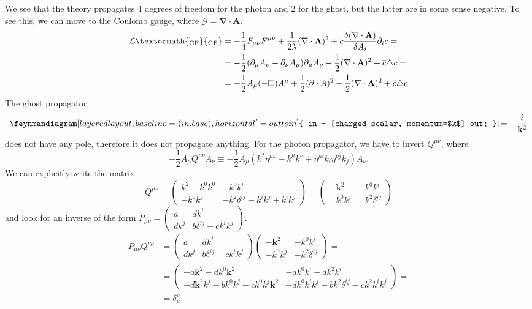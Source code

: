 \documentclass[a4paper,12pt]{book}
\newcommand{\ped}[1]{\textormath{\textsubscript{#1}}{_{\mathrm{#1}}}}
\renewcommand{\vec}{\mathbf}
\theoremstyle{definition}
\theoremstyle{remark}
\begin{document}
We see that the theory propagates 4 degrees of freedom for the photon and 2 for the ghost, but the latter are in some sense negative. To see this, we can move to the Coulomb gauge, where $\mathcal G=\vec\nabla\cdot\vec A$.
\begin{align*}
\mathcal L\ped{GF}&=-\frac14F_{\mu\nu}F^{\mu\nu}+\frac1{2\lambda}(\vec\nabla\cdot\vec A)^2+\overline c\frac{\delta (\vec\nabla\cdot\vec A)}{\delta A_i}\partial_i c=\\
&=-\frac12(\partial_\mu A_\nu-\partial_\nu A_\mu)\partial_\mu A_\nu-\frac12(\vec\nabla\cdot\vec A)^2+\overline c\triangle c=\\
&=-\frac12A_\mu(-\Box)A^\mu+\frac12(\partial\cdot A)^2-\frac12(\vec\nabla\cdot\vec A)^2+\overline c\triangle c
\end{align*}
The ghost propagator
\[
\feynmandiagram [layered layout, baseline=(in.base), horizontal'=out to in] {
in -- [charged scalar, momentum=$k$] out;
};
=-\frac{i}{\vec k^2}
\]
does not have any pole, therefore it does not propagate anything. For the photon propagator, we have to invert $Q^{\mu\nu}$, where
\[-\frac12A_\mu Q^{\mu\nu}A_\nu\equiv-\frac12A_\mu(k^2\eta^{\mu\nu}-k^\mu k^\nu+\eta^{\mu i}k_i\eta^{\nu j}k_j)A_\nu.\]
We can explicitly write the matrix
\[
Q^{\mu\nu}=
\begin{pmatrix}
k^2-k^0k^0 & -k^0k^i\\
-k^0k^j & -k^2\delta^{ij}-k^ik^j+k^ik^j
\end{pmatrix}=
\begin{pmatrix}
-\vec k^2 & -k^0k^i\\
-k^0k^j & -k^2\delta^{ij}
\end{pmatrix}
\]
and look for an inverse of the form $P_{\mu\nu}=
\begin{pmatrix}
a & dk^i\\
dk^j & b\delta^{ij}+ck^ik^j
\end{pmatrix}$.
\begin{align*}
P_{\mu\nu}Q^{\nu\rho}&=\begin{pmatrix}
a & dk^i\\
dk^j & b\delta^{ij}+ck^ik^j
\end{pmatrix}
\begin{pmatrix}
-\vec k^2 & -k^0k^i\\
-k^0k^j & -k^2\delta^{ij}
\end{pmatrix}=\\
&=
\begin{pmatrix}
-a\vec k^2-dk^0\vec k^2 & -ak^0k^i-dk^2k^i\\
-d\vec k^2k^j-bk^0k^j-ck^0k^j\vec k^2 & -dk^0k^ik^j-bk^2\delta^{ij}-ck^2k^ik^j
\end{pmatrix}=\\
&=\delta^\rho_\mu
\end{align*}
\end{document}
